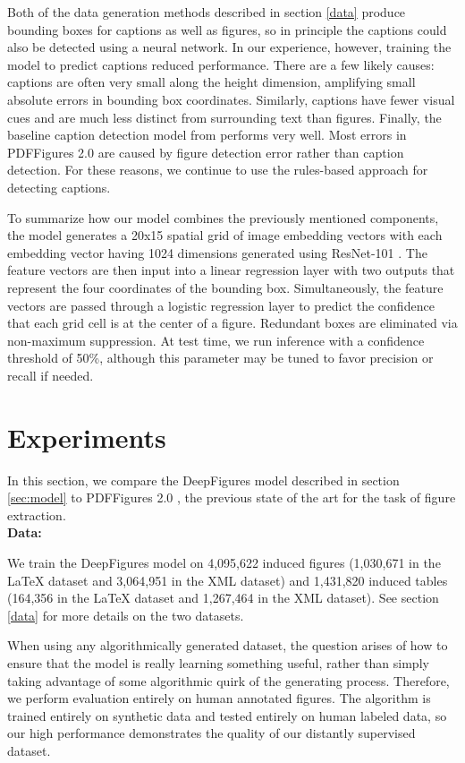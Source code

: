 \documentclass[sigconf]{acmart}
\begin{document}
Both of the data generation methods described in section \ref{data} produce bounding boxes for captions as well as figures, so in principle the captions could also be detected using a neural network. In our experience, however, training the model to predict captions reduced performance. There are a few likely causes: captions are often very small along the height dimension, amplifying small absolute errors in bounding box coordinates. Similarly, captions have fewer visual cues and are much less distinct from surrounding text than figures. Finally, the baseline caption detection model from \cite{pdffigures} performs very well. Most errors in PDFFigures 2.0 are caused by figure detection error rather than caption detection. For these reasons, we continue to use the rules-based approach for detecting captions. 

To summarize how our model combines the previously mentioned components, the model generates a 20x15 spatial grid of image embedding vectors with each embedding vector having 1024 dimensions generated using ResNet-101 \cite{resnet}.
The feature vectors are then input into a linear regression layer with two outputs that represent the four coordinates of the bounding box. Simultaneously, the feature vectors are passed through a logistic regression layer to predict the confidence that each grid cell is at the center of a figure. Redundant boxes are eliminated via non-maximum suppression. At test time, we run inference with a confidence threshold of 50\%, although this parameter may be tuned to favor precision or recall if needed.

\section{Experiments}\label{results}
In this section, we compare the DeepFigures model described in section \ref{sec:model} to PDFFigures 2.0 \cite{pdffigures2}, the previous state of the art for the task of figure extraction.
\\[15pt]\textbf{Data:}

We train the DeepFigures model on 4,095,622 induced figures (1,030,671 in the LaTeX dataset and 3,064,951 in the XML dataset) and 1,431,820 induced tables (164,356 in the LaTeX dataset and 1,267,464 in the XML dataset).
See section \ref{data} for more details on the two datasets.

When using any algorithmically generated dataset, the question arises of how to ensure that the model is really learning something useful, rather than simply taking advantage of some algorithmic quirk of the generating process. Therefore, we perform evaluation entirely on human annotated figures. The algorithm is trained entirely on synthetic data and tested entirely on human labeled data, so our high performance demonstrates the quality of our distantly supervised dataset.
\end{document}
